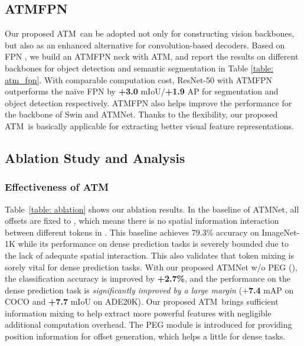 \documentclass[letterpaper]{article} \usepackage{aaai23v}  \usepackage{times}  \usepackage{helvet}  \usepackage{courier}  \usepackage[hyphens]{url}  \usepackage{graphicx} \urlstyle{rm} \def\UrlFont{\rm}  \usepackage{caption} \frenchspacing  \setlength{\pdfpagewidth}{8.5in}  \setlength{\pdfpageheight}{11in}  \usepackage{algorithm}
\newcommand{\ours}{{ATMNet}}
\newcommand{\ourcore}{{ATM}}
\begin{document}
\subsection{ATMFPN}
Our proposed \ourcore~can be adopted not only for constructing vision backbones, but also as an enhanced alternative for convolution-based decoders.
Based on FPN \cite{lin2017FPN}, we build an ATMFPN neck with ATM, and report the results on different backbones for object detection and semantic segmentation in Table \ref{table: atm_fpn}. 
With comparable computation cost, ResNet-50 with ATMFPN outperforms the na\"ive FPN by \textbf{+3.0} mIoU/\textbf{+1.9} AP for segmentation and object detection respectively. ATMFPN also helps improve the performance for the backbone of Swin and \ours.
Thanks to the flexibility, our proposed \ourcore~is basically applicable for extracting better visual feature representations.

\subsection{Ablation Study and Analysis}
\label{sec: abla}



\noindent
\subsubsection{Effectiveness of ATM} Table~\ref{table: ablation} shows our ablation results.
In the baseline  of \ours, all offsets are fixed to , which means there is no spatial information interaction between different tokens in . This baseline achieves 79.3\%  accuracy on ImageNet-1K while its performance on dense prediction tasks is severely bounded due to the lack of adequate spatial interaction.
This also validates that token mixing is sorely vital for dense prediction tasks. With our proposed ATMNet w/o PEG (), the classification accuracy is improved by \textbf{+2.7\%}, and the performance on the dense prediction task is \textit{significantly improved by a large margin} (+\textbf{7.4} mAP on COCO and \textbf{+7.7} mIoU on ADE20K). Our proposed \ourcore~brings sufficient information mixing to help extract more powerful features with negligible additional computation overhead. The PEG module is introduced for providing position information for offset generation, which helps a little for dense tasks.
\end{document}
